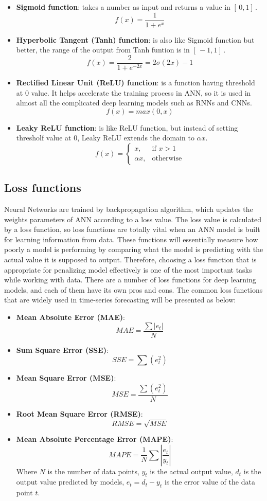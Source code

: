 \documentclass[../main.tex]{subfiles}
\begin{document}
\begin{itemize}
\item \textbf{Sigmoid function}: takes a number as input and returns a value in $	[ \,0,1] \,$.
	$$f(x) = \frac{1}{1+e^x}$$
\item \textbf{Hyperbolic Tangent (Tanh) function}: is also like Sigmoid function but better, the range of the output from Tanh funtion is in $	[ \,-1,1] \,$.
 $$f(x) = \frac{2}{1+e^{-2x}} = 2\sigma(2x)-1$$
\item \textbf{Rectified Linear Unit (ReLU) function}: is a function having threshold at $0$ value. It helps accelerate the training process in ANN, so it is used in almost all the complicated deep learning models such as RNNs and CNNs.
$$f(x) = max(0, x)$$
\item \textbf{Leaky ReLU function}: is like ReLU function, but instead of setting thresholf value at $0$, Leaky ReLU extends the domain to $\alpha x$.
\[
    f(x)= 
\begin{cases}
    x,& \text{if } x > 1\\
    \alpha x, & \text{otherwise}
\end{cases}
\]
\end{itemize}
	
\subsection{Loss functions}
\label{ann_loss_func}
Neural Networks are trained by backpropagation algorithm, which updates the weights parameters of ANN according to a loss value. The loss value is calculated by a loss function, so loss functions are totally vital when an ANN model is built for learning information from data. These functions will essentially measure how poorly a model is performing by comparing what the model is predicting with the actual value it is supposed to output. Therefore, choosing a loss function that is appropriate for penalizing model effectively is one of the most important tasks while working with data. There are a number of loss functions for deep learning models, and each of them have its own pros and cons. The common loss functions that are widely used in time-series forecasting will be presented as below:
\begin{itemize}
\item  \textbf{Mean Absolute Error (MAE)}: 
$$MAE = \frac{\sum|e_t|}{N}$$
\item  \textbf{Sum Square Error (SSE)}: $$SSE = \sum(e_t^2)$$
\item  \textbf{Mean Square Error (MSE)}: $$MSE = \frac{\sum(e_t^2)}{N}$$
\item  \textbf{Root Mean Square Error (RMSE)}: $$RMSE = \sqrt{MSE}$$
\item  \textbf{Mean Absolute Percentage Error (MAPE)}: $$MAPE = \frac{1}{N}\sum|\frac{e_t}{y_t}|$$
Where $N$ is the number of data points, $y_t$ is the actual output value, $d_t$ is the output value predicted by models, $e_t = d_t - y_t$ is the error value of the data point $t$.
\end{itemize}
	 
\end{document}
